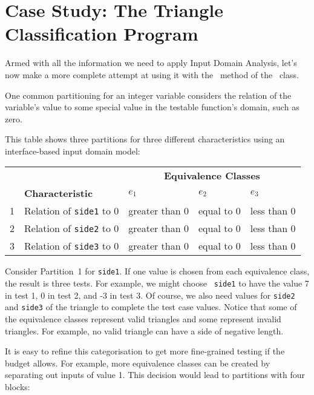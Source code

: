 \section{Case Study: The Triangle Classification Program}

Armed with all the information we need to apply Input Domain Analysis, let's now
make a more complete attempt at using it with the \classifymethod~method of the
\triangleclass~class. 

One common partitioning for an integer variable considers the relation of the
variable's value to some special value in the testable function's domain, such
as zero.

This table shows three partitions for three different characteristics using an
interface-based input domain model:

\begin{center}
\begin{tabular}{rllll}
    \toprule
    & & \multicolumn{3}{c}{\bf Equivalence Classes} \\
    \cline{3-5}
    & {\bf Characteristic} & $e_1$ & $e_2$ & $e_3$ \\
    \midrule
    1 & Relation of {\tt side1} to 0 & greater than 0 & equal to 0 & less than 0 \\
    2 & Relation of {\tt side2} to 0 & greater than 0 & equal to 0 & less than 0 \\
    3 & Relation of {\tt side3} to 0 & greater than 0 & equal to 0 & less than 0 \\
    \bottomrule    
\end{tabular}
\end{center}

Consider Partition~1 for {\tt side1}. If one value is chosen from each
equivalence class, the result is three tests. For example, we might choose {\tt
side1} to have the value 7 in test 1, 0 in test 2, and -3 in test 3. Of course,
we also need values for {\tt side2} and {\tt side3} of the triangle to complete
the test case values. Notice that some of the equivalence classes represent
valid triangles and some represent invalid triangles. For example, no valid
triangle can have a side of negative length. 

It is easy to refine this categorisation to get more fine-grained testing if the
budget allows. For example, more equivalence classes can be created by
separating out inputs of value 1. This decision would lead to partitions with four
blocks:

